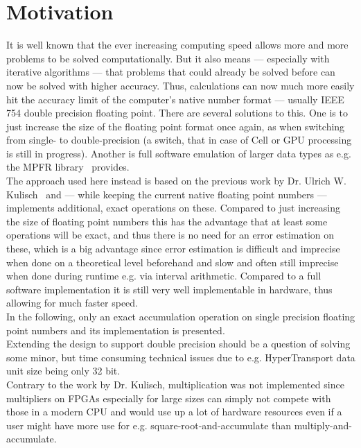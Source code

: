 
\chapter{Motivation}
It is well known that the ever increasing computing speed allows more
and more problems to be solved computationally.
But it also means --- especially with iterative algorithms --- that problems
that could already be solved before can now be solved with higher accuracy.
Thus, calculations can now much more easily hit the accuracy limit of the
computer's native number format --- usually IEEE 754 double precision floating
point.
There are several solutions to this. One is to just increase the size of the
floating point format once again, as when switching from single- to
double-precision (a switch, that in case of Cell or GPU processing is still in
progress).
Another is full software emulation of larger data types as e.g. the
MPFR library~\cite{mpfr} provides.\\
The approach used here instead is based on the previous work by
Dr. Ulrich W. Kulisch~\cite{advar} and --- while keeping the current native
floating point numbers --- implements additional, exact operations on these.
Compared to just increasing the size of floating point numbers this has the
advantage that at least some operations will be exact, and thus there is no
need for an error estimation on these, which is a big advantage since error
estimation is difficult and imprecise when done on a theoretical level
beforehand and slow and often still imprecise when done during runtime e.g.
via interval arithmetic.
Compared to a full software implementation it is still very well implementable
in hardware, thus allowing for much faster speed.\\
In the following, only an exact accumulation operation on single precision floating
point numbers and its implementation is presented.\\
Extending the design to support double precision should be a question of solving
some minor, but time consuming technical issues due to e.g. HyperTransport data
unit size being only 32 bit.\\
Contrary to the work by Dr. Kulisch, multiplication was not implemented since
multipliers on FPGAs especially for large sizes can simply not compete with
those in a modern CPU and would use up a lot of hardware resources even if
a user might have more use for e.g. square-root-and-accumulate than
multiply-and-accumulate.

